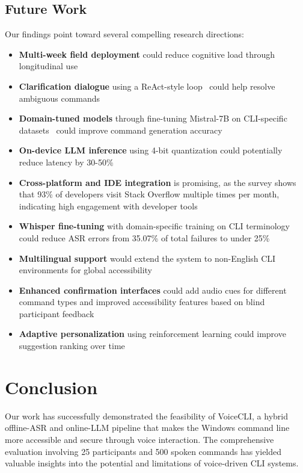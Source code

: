 \documentclass[a4paper,12pt]{article}
\begin{document}
\subsection{Future Work}  
\label{sec:future}  
\noindent Our findings point toward several compelling research directions:
\begin{itemize}
\setlength{\itemsep}{4pt}
\setlength{\parskip}{2pt}
\item \textbf{Multi-week field deployment} could reduce cognitive load through longitudinal use~\cite{ref4}
\item \textbf{Clarification dialogue} using a ReAct-style loop~\cite{ref20} could help resolve ambiguous commands
\item \textbf{Domain-tuned models} through fine-tuning Mistral-7B on CLI-specific datasets~\cite{ref26} could improve command generation accuracy
\item \textbf{On-device LLM inference} using 4-bit quantization could potentially reduce latency by 30-50\%~\cite{ref24}
\item \textbf{Cross-platform and IDE integration} is promising, as the survey shows that 93\% of developers visit Stack Overflow multiple times per month, indicating high engagement with developer tools~\cite{ref2}
\item \textbf{Whisper fine-tuning} with domain-specific training on CLI terminology could reduce ASR errors from 35.07\% of total failures to under 25\%
\item \textbf{Multilingual support} would extend the system to non-English CLI environments for global accessibility
\item \textbf{Enhanced confirmation interfaces} could add audio cues for different command types and improved accessibility features based on blind participant feedback
\item \textbf{Adaptive personalization} using reinforcement learning could improve suggestion ranking over time
\end{itemize}
\newpage
\section{Conclusion}  

Our work has successfully demonstrated the feasibility of VoiceCLI, a hybrid offline-ASR and online-LLM pipeline that makes the Windows command line more accessible and secure through voice interaction. The comprehensive evaluation involving 25 participants and 500 spoken commands has yielded valuable insights into the potential and limitations of voice-driven CLI systems.
\end{document}
